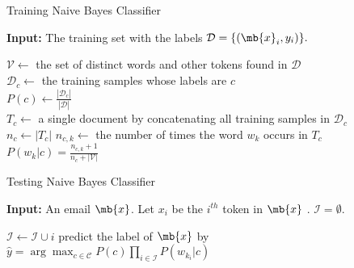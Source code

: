 \begin{exercise}
    \begin{center}
        \begin{minipage}{0.9\linewidth}
            \begin{algorithm}[H]
                \caption{Training Naive Bayes Classifier}
                \label{alg:train_bayes}
                \textbf{Input:} The training set with the labels $\mathcal{D}=\{(\mb{x}_i,y_i)\}.$
                \begin{algorithmic}[1]
                    \STATE $\mathcal{V}\leftarrow$ the set of distinct words and other tokens found in $\mathcal{D}$\\
                    \STATE $\mathcal{D}_c\leftarrow$ the training samples whose labels are $c$\\
                    \STATE $P(c)\leftarrow\frac{|\mathcal{D}_c|}{|\mathcal{D}|}$\\
                    \STATE $T_c\leftarrow$ a single document by concatenating all training samples in $\mathcal{D}_c$\\
                    \STATE $n_c\leftarrow |T_c|$
                    \STATE $n_{c,k}\leftarrow$ the number of times the word $w_k$ occurs in $T_c$\\
                    \STATE $P(w_k|c)=\frac{n_{c,k}+1}{n_c+|\mathcal{V}|}$
                    \ENDFOR
                    \ENDFOR
                \end{algorithmic}
            \end{algorithm}
        \end{minipage}
    \end{center}

    \begin{center}
        \begin{minipage}{0.9\linewidth}
            \begin{algorithm}[H]
                \caption{Testing Naive Bayes Classifier }
                \label{alg:test_bayes}
                \textbf{Input:} An email $\mb{x}$. Let $x_i$ be the $i^{th}$ token in $\mb{x}$ . $\mathcal{I}=\emptyset.$
                \begin{algorithmic}[1]
                    \STATE $\mathcal{I}\leftarrow\mathcal{I}\cup i$
                    \ENDIF
                    \ENDFOR
                    \STATE predict the label of $\mb{x}$ by $\hat{y}=\arg\max_{c\in\mathcal{C}} P(c)\prod_{i\in\mathcal{I}}P(w_{k_i}|c)$
                \end{algorithmic}
            \end{algorithm}
        \end{minipage}
    \end{center}
\end{exercise}
